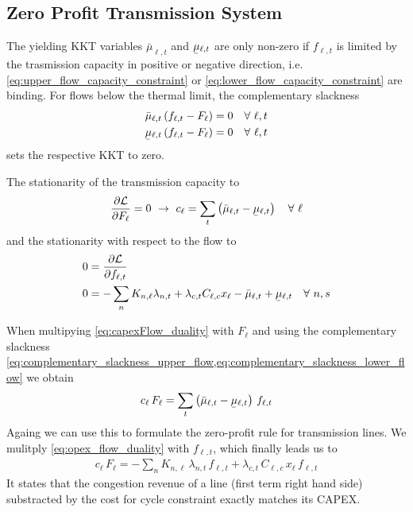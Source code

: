 \documentclass[11pt,twocolumn]{article}
\newcommand{\ubar}[1]{\underaccent{\bar}{#1}}
\newcommand{\Forall}[1]{\hspace{10pt} \forall \,\, #1 }
\newcommand{\pdv}[2]{\frac{\partial #1}{\partial #2}}
\newcommand{\flow}{f_{\ell,t}}
\newcommand{\capacityflow}{F_{\ell}}
\newcommand{\capitalpriceflow}{c_{\ell}}
\newcommand{\mulowerflow}{\ubar{\mu}_{\ell,t}}
\newcommand{\muupperflow}{\bar{\mu}_{\ell,t}}
\newcommand{\lagrangian}{\mathcal{L}}
\newcommand{\lmp}[1][n]{\lambda_{#1,t}}
\newcommand{\incidence}[1][n]{K_{#1,\ell}}
\newcommand{\cycle}{C_{\ell,c}}
\newcommand{\impedance}{x_\ell}
\newcommand{\cycleprice}{\lambda_{c,t}}
\begin{document}
\subsection{Zero Profit Transmission System}
\label{sec:zero_profit_flow}

The yielding KKT variables $\muupperflow$ and $\mulowerflow$ are only non-zero if $\flow$ is limited by the trasmission capacity in positive or negative direction, i.e. \cref{eq:upper_flow_capacity_constraint} or \cref{eq:lower_flow_capacity_constraint} are binding. For flows below the thermal limit, the complementary slackness 
\begin{align}
\muupperflow \left( \flow - \capacityflow \right)  &= 0 \Forall{\ell,t}
\label{eq:complementary_slackness_upper_flow} \\
\mulowerflow \left( \flow - \capacityflow \right) &=  0 \Forall{\ell,t}
\label{eq:complementary_slackness_lower_flow} 
\end{align}
sets the respective KKT to zero. 

The stationarity of the transmission capacity to
\begin{align}
\pdv{\lagrangian}{\capacityflow} = 0 \,\, \rightarrow \,\, 
\capitalpriceflow =  \sum_t \left( \muupperflow - \mulowerflow \right) \Forall{\ell}
\label{eq:capexFlow_duality}
\end{align}
and the stationarity with respect to the flow to
\begin{align}
    0 &= \pdv{\lagrangian}{\flow}  \\ 
    0 &= - \sum_n \incidence \lmp  + \cycleprice \cycle \impedance  - \muupperflow + \mulowerflow \Forall{n,s} \label{eq:opex_flow_duality}
\end{align}
    
    
When multipying \cref{eq:capexFlow_duality} with $\capacityflow$ and using the complementary slackness \cref{eq:complementary_slackness_upper_flow,eq:complementary_slackness_lower_flow} we obtain 
\begin{align}
 \capitalpriceflow \, \capacityflow = \sum_t \left( \muupperflow - \mulowerflow \right)  \, \flow
 \label{eq:capital_price_flow_sum}
\end{align}
Againg we can use this to formulate the zero-profit rule for transmission lines. We mulitply \cref{eq:opex_flow_duality} with $\flow$, which finally leads us to 
\begin{align}
\capitalpriceflow \, \capacityflow = - \sum_n \incidence\, \lmp\, \flow + \cycleprice\, \cycle\, \impedance\, \flow 
\end{align}
It states that the congestion revenue of a line (first term right hand side) substracted by the cost for cycle constraint exactly matches its CAPEX. 
\end{document}
